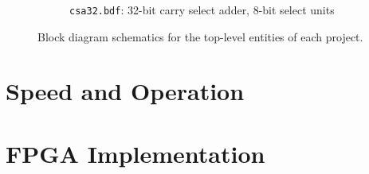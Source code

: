 \documentclass[a4paper,11pt]{article}
\begin{document}
\begin{figure}[!h]
\begin{subfigure}[b]{\textwidth}
		\caption{\texttt{csa32.bdf}: 32-bit carry select adder, 8-bit select units}
		\label{fig:csa32.bdf}
	\end{subfigure}
	\caption{Block diagram schematics for the top-level entities of each project.}
	\label{fig:top-level}
\end{figure}

\section{Speed and Operation}

\section{FPGA Implementation}

\printbibliography
\end{document}
